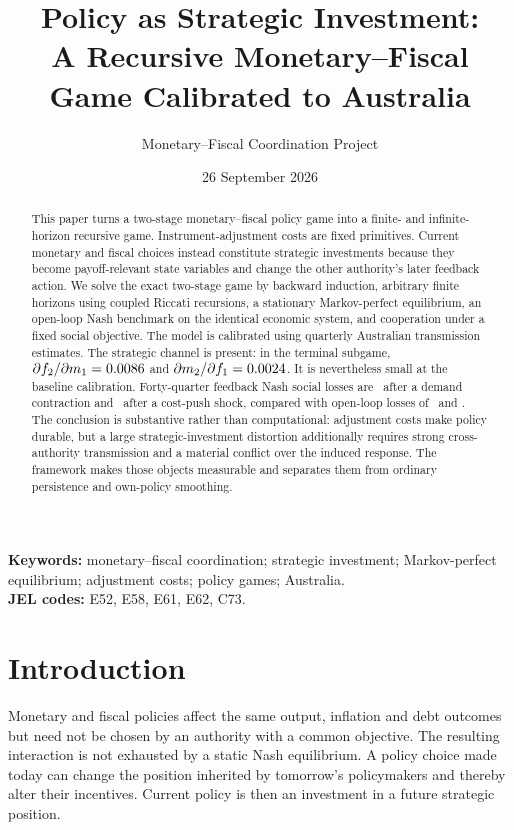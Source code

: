 \documentclass[11pt]{article}
\title{Policy as Strategic Investment:\\
A Recursive Monetary--Fiscal Game Calibrated to Australia}
\author{Monetary--Fiscal Coordination Project}
\date{26 September 2026}
\begin{document}
\maketitle

\begin{abstract}
This paper turns a two-stage monetary--fiscal policy game into a finite- and
infinite-horizon recursive game.  Instrument-adjustment costs are fixed
primitives.  Current monetary and fiscal choices instead constitute strategic
investments because they become payoff-relevant state variables and change the
other authority's later feedback action.  We solve the exact two-stage game by
backward induction, arbitrary finite horizons using coupled Riccati recursions,
a stationary Markov-perfect equilibrium, an open-loop Nash benchmark on the
identical economic system, and cooperation under a fixed social objective.
The model is calibrated using quarterly Australian transmission estimates.
The strategic channel is present: in the terminal subgame,
$\partial f_2/\partial m_1=0.0086$ and
$\partial m_2/\partial f_1=0.0024$.  It is nevertheless small
at the baseline calibration.  Forty-quarter feedback Nash social losses are
\DemandFeedbackLoss\ after a demand contraction and \SupplyFeedbackLoss\
after a cost-push shock, compared with open-loop losses of \DemandOpenLoss\
and \SupplyOpenLoss.  The conclusion is substantive rather than computational:
adjustment costs make policy durable, but a large strategic-investment
distortion additionally requires strong cross-authority transmission and a
material conflict over the induced response.  The framework makes those
objects measurable and separates them from ordinary persistence and own-policy
smoothing.
\end{abstract}

\noindent\textbf{Keywords:} monetary--fiscal coordination; strategic
investment; Markov-perfect equilibrium; adjustment costs; policy games;
Australia.\\
\textbf{JEL codes:} E52, E58, E61, E62, C73.

\section{Introduction}

Monetary and fiscal policies affect the same output, inflation and debt
outcomes but need not be chosen by an authority with a common objective.  The
resulting interaction is not exhausted by a static Nash equilibrium.  A policy
choice made today can change the position inherited by tomorrow's policymakers
and thereby alter their incentives.  Current policy is then an investment in a
future strategic position.
\end{document}
